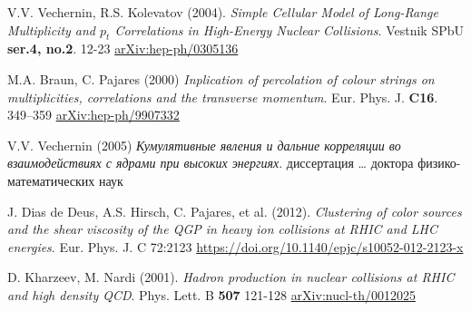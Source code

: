 \begin{thebibliography}{24}
V.V. Vechernin, R.S. Kolevatov (2004).
\textit{Simple Cellular Model of Long-Range Multiplicity and $p_t$ Correlations in High-Energy Nuclear Collisions}.
Vestnik SPbU
\textbf{ser.4, no.2}.
12-23
\href{https://arxiv.org/abs/hep-ph/0305136}{arXiv:hep-ph/0305136}

M.A. Braun, C. Pajares (2000)
\textit{Inplication of percolation of colour strings on multiplicities, correlations and the transverse momentum}.
Eur. Phys. J.
\textbf{C16}.
349–359
\href{https://arxiv.org/abs/hep-ph/9907332v1}{arXiv:hep-ph/9907332}

V.V. Vechernin (2005)
\textit{Кумулятивные явления и дальние корреляции во взаимодействиях с ядрами при высоких энергиях}.
диссертация … доктора физико-математических наук

J. Dias de Deus, A.S. Hirsch, C. Pajares, et al. (2012).
\textit{Clustering of color sources and the shear viscosity of the QGP in heavy ion collisions at RHIC and LHC energies}.
Eur. Phys. J. C 72:2123
\url{https://doi.org/10.1140/epjc/s10052-012-2123-x}

D. Kharzeev, M. Nardi (2001).
\textit{Hadron production in nuclear collisions at RHIC and high density QCD}.
Phys. Lett. B
\textbf{507}
121-128
\href{https://arxiv.org/abs/nucl-th/0012025}{arXiv:nucl-th/0012025}

\end{thebibliography}